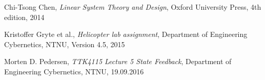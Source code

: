 
\begin{thebibliography}{9}
  Chi-Tsong Chen,
  \emph{Linear System Theory and Design},
  Oxford University Press,
  4th edition,
  2014

  Kristoffer Gryte et al.,
  \emph{Helicopter lab assignment},
  Department of Engineering Cybernetics,
  NTNU,
  Version 4.5,
  2015

  Morten D. Pedersen,
  \emph{TTK4115 Lecture 5 State Feedback},
  Department of Engineering Cybernetics,
  NTNU,
  19.09.2016
	
\end{thebibliography}